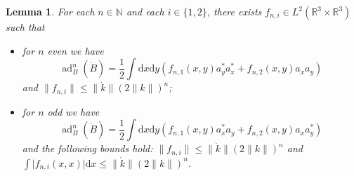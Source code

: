 \documentclass[11pt,a4paper,draft,DIV11]{scrartcl}	%
\newtheorem{lem}[thm]{Lemma}
\newcommand{\ad}{\operatorname{ad}}	%
\newcommand{\di}{\textrm{d}}		%
\newcommand{\Rbb}{\mathbb{R}}		%
\newcommand{\Nbb}{\mathbb{N}}		%
\newcommand{\norm}[1]{\lVert#1\rVert}	%
\newcommand{\bd}{\begin{displaymath}}			%
\newcommand{\ed}{\end{displaymath}}
\begin{document}
\begin{lem}
\label{lm:highercommutators}
 For each $n \in \Nbb$ and each $i \in \{1,2\}$, there exists $f_{n,i} \in L^2(\Rbb^3 \times \Rbb^3)$ such that
\begin{itemize}
 \item for $n$ even we have
\bd
\ad^n_B(\dot B) = \frac{1}{2} \int \di x\di y\left( f_{n,1}(x,y) a^\ast_y a^\ast_x + f_{n,2}(x,y) a_x a_y \right)
\ed
and $\norm{f_{n,i}} \leq \norm{\dot k} (2\norm{k})^n$; 
 \item for $n$ odd we have
\bd
\ad^n_B(\dot B) = \frac{1}{2} \int \di x\di y\left( f_{n,1}(x,y) a^\ast_x a_y + f_{n,2}(x,y) a_x a^\ast_y \right)
\ed
and the following bounds hold: $\norm{f_{n,i}} \leq \norm{\dot k} (2\norm{k})^n$ and $\int \lvert f_{n,i}(x,x)\rvert \di x \leq \norm{\dot k} (2\norm{k})^n$. 
\end{itemize}
\end{lem}
\end{document}
